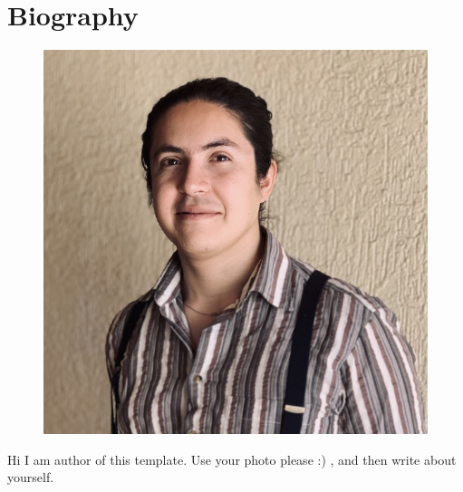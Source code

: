 \chapter*{Biography}
\vspace{-2cm}
\begin{figure}[H]
    \centering
    \includegraphics[width=0.4\linewidth,frame]{Thesis/Manuscript/Images/Frontmatter/ProfilePhoto2.png}
\end{figure}

Hi I am author of this template. Use your photo please :) , and then write about yourself.
